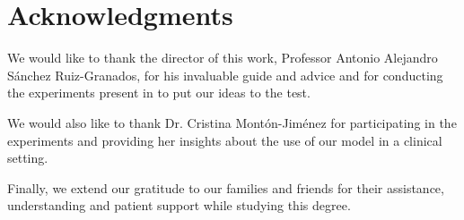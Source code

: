 \thispagestyle{empty}

\section*{Acknowledgments}
We would like to thank the director of this work, Professor Antonio Alejandro Sánchez Ruiz-Granados, for his invaluable guide and advice and for conducting the experiments present in  to put our ideas to the test.

We would also like to thank Dr. Cristina Montón-Jiménez for participating in the experiments and providing her insights about the use of our model in a clinical setting.

Finally, we extend our gratitude to our families and friends for their assistance, understanding and patient support while studying this degree.